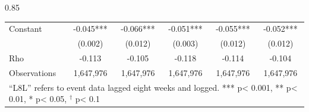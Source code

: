 \documentclass[12pt,letterpaper]{article}
\begin{document}
\begin{landscape}
\begin{center}
\begin{spacing}{0.85}
\begin{longtable}{lccccc}
Constant & -0.045*** & -0.066*** & -0.051*** & -0.055*** & -0.052*** \\
 & (0.002)  & (0.012)  & (0.003)  & (0.012)  & (0.012)  \\ \hline

Rho & -0.113  & -0.105  & -0.118  & -0.114  & -0.104  \\
                
Observations  & 1,647,976  & 1,647,976  & 1,647,976  & 1,647,976  & 1,647,976  \\

\hline  
\multicolumn{6}{l}{``L8L'' refers to event data lagged eight weeks and logged.  *** p< 0.001, ** p< 0.01, * p< 0.05, $^{\dag}$ p< 0.1} \\
 
\end{longtable}
\end{spacing}
\end{center}
\end{landscape}





\clearpage

\newpage 

\end{document}
